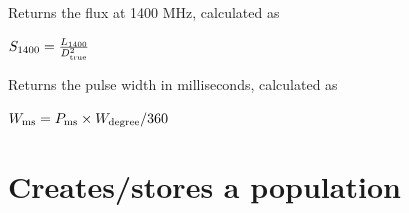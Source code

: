 \documentclass[letterpaper,10pt,english]{sphinxmanual}
\begin{document}

\begin{fulllineitems}
\label{\detokenize{module-level-docs:pulsar.Pulsar.s_1400}}
\pysigstartsignatures
\pysiglinewithargsret
{}
{}
{}
\pysigstopsignatures
\sphinxAtStartPar
Returns the flux at 1400 MHz, calculated as

\sphinxAtStartPar
\(S_{\rm{1400}} = \frac{L_{\rm{1400}}}{D_{\rm{true}}^2}\)

\end{fulllineitems}


\begin{fulllineitems}
\label{\detokenize{module-level-docs:pulsar.Pulsar.width_ms}}
\pysigstartsignatures
\pysiglinewithargsret
{}
{}
{}
\pysigstopsignatures
\sphinxAtStartPar
Returns the pulse width in milliseconds, calculated as

\sphinxAtStartPar
\(W_{\rm{ms}} = P_{\rm{ms}} \times W_{\rm{degree}} / 360\)

\end{fulllineitems}



\section{ \textendash{} Creates/stores a population}
\label{\detokenize{module-level-docs:module-population}}\label{\detokenize{module-level-docs:population-creates-stores-a-population}}\label{\detokenize{module-level-docs:population-module-docs}}

\begin{fulllineitems}
\label{\detokenize{module-level-docs:population.Population}}
\pysigstartsignatures
\pysigline
{}
\pysigstopsignatures
\end{fulllineitems}
\end{document}
